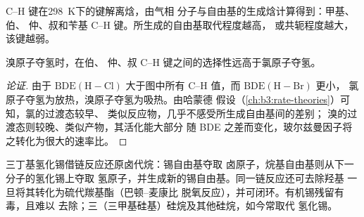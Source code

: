 \begin{omfigure}

{\small C--H 键在\qty{298}{K}下的键解离焓，由气相
分子与自由基的生成焓计算得到：甲基、伯、
仲、叔和苄基 C--H 键。所生成的自由基取代程度越高，
或共轭程度越大，该键越弱。}
\end{omfigure}

\begin{proposition}[卤代反应的选择性]\label{prop:b3:radicals-carbenes:halogenation-selectivity}
溴原子夺氢时，在伯、
仲、叔 C--H 键之间的选择性远高于氯原子夺氢。
\end{proposition}

\begin{proof}[论证]
由于 $\mathrm{BDE(H{-}Cl)}$ 大于图中所有 C--H 值，而 $\mathrm{BDE(H{-}Br)}$ 更小，
氯原子夺氢为放热，溴原子夺氢为吸热。由哈蒙德
假设（\cref{ch:b3:rate-theories}）可知，氯的过渡态较早、
类似反应物，几乎不感受所生成自由基间的差别；
溴的过渡态则较晚、类似产物，其活化能大部分
随 BDE 之差而变化，玻尔兹曼因子将之转化为很大的速率比。
\end{proof}

三丁基氢化锡借链反应还原卤代烷：锡自由基夺取
卤原子，烷基自由基则从下一分子的氢化锡上夺取
氢原子，并生成新的锡自由基。同一链反应还可去除羟基
一旦将其转化为硫代羰基酯（巴顿–麦康比
脱氧反应），并可闭环。有机锡残留有毒，且难以
去除；三（三甲基硅基）硅烷及其他硅烷，如今常取代
氢化锡。

